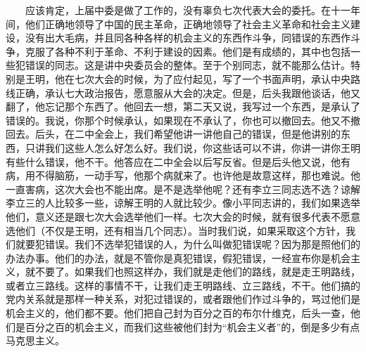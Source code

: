 \documentclass[cn,11pt,chinese]{elegantbook}
\begin{document}
　　应该肯定，上届中委是做了工作的，没有辜负七次代表大会的委托。在十一年间，他们正确地领导了中国的民主革命，正确地领导了社会主义革命和社会主义建设，没有出大毛病，并且同各种各样的机会主义的东西作斗争，同错误的东西作斗争，克服了各种不利于革命、不利于建设的因素。他们是有成绩的，其中也包括一些犯错误的同志。这是讲中央委员会的整体。至于个别同志，就不能那么估计。特别是王明，他在七次大会的时候，为了应付起见，写了一个书面声明，承认中央路线正确，承认七大政治报告，愿意服从大会的决定。但是，后头我跟他谈话，他又翻了，他忘记那个东西了。他回去一想，第二天又说，我写过一个东西，是承认了错误的。我说，你那个时候承认，如果现在不承认了，你也可以撤回去。他又不撤回去。后头，在二中全会上，我们希望他讲一讲他自己的错误，但是他讲别的东西，只讲我们这些人怎么好怎么好。我们说，你这些话可以不讲，你讲一讲你王明有些什么错误，他不干。他答应在二中全会以后写反省。但是后头他又说，他有病，用不得脑筋，一动手写，他那个病就来了。也许他是故意这样，那也难说。他一直害病，这次大会也不能出席。是不是选举他呢？还有李立三同志选不选？谅解李立三的人比较多一些，谅解王明的人就比较少。像小平同志讲的，我们如果选举他们，意义还是跟七次大会选举他们一样。七次大会的时候，就有很多代表不愿意选他们（不仅是王明，还有相当几个同志）。当时我们说，如果采取这个方针，我们就要犯错误。我们不选举犯错误的人，为什么叫做犯错误呢？因为那是照他们的办法办事。他们的办法，就是不管你是真犯错误，假犯错误，一经宣布你是机会主义，就不要了。如果我们也照这样办，我们就是走他们的路线，就是走王明路线，或者立三路线。这样的事情不干，让我们走王明路线、立三路线，不干。他们搞的党内关系就是那样一种关系，对犯过错误的，或者跟他们作过斗争的，骂过他们是机会主义的，他们都不要。他们把自己封为百分之百的布尔什维克，后头一查，他们是百分之百的机会主义，而我们这些被他们封为“机会主义者”的，倒是多少有点马克思主义。\\
\end{document}
